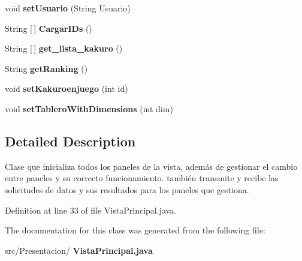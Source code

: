 \begin{DoxyCompactItemize}
\mbox{\label{class_presentacion_1_1_vista_principal_a40d595637eecfc198239a1cd1c05fbce}} 
void {\bfseries set\+Usuario} (String Usuario)
\item 
\mbox{\label{class_presentacion_1_1_vista_principal_a97c11c0e43c900c7cc2dfc4d4ed2ccb6}} 
String [$\,$] {\bfseries Cargar\+I\+Ds} ()
\item 
\mbox{\label{class_presentacion_1_1_vista_principal_a45ebd0e10cf0731cbd580006a2b9e365}} 
String [$\,$] {\bfseries get\+\_\+lista\+\_\+kakuro} ()
\item 
\mbox{\label{class_presentacion_1_1_vista_principal_a9c44d939388c8198de20e1255cd41313}} 
String {\bfseries get\+Ranking} ()
\item 
\mbox{\label{class_presentacion_1_1_vista_principal_ab5947b202b60acac8287ea0a3986af40}} 
void {\bfseries set\+Kakuroenjuego} (int id)
\item 
\mbox{\label{class_presentacion_1_1_vista_principal_af1096a92a8f67defc858f0559ec4adaa}} 
void {\bfseries set\+Tablero\+With\+Dimensions} (int dim)
\end{DoxyCompactItemize}


\subsection{Detailed Description}
Clase que inicializa todos los paneles de la vista, además de gestionar el cambio entre paneles y su correcto funcionamiento. también transmite y recibe las solicitudes de datos y sus resultados para los paneles que gestiona. 

Definition at line 33 of file Vista\+Principal.\+java.



The documentation for this class was generated from the following file\+:\begin{DoxyCompactItemize}
\item 
src/\+Presentacion/\textbf{ Vista\+Principal.\+java}\end{DoxyCompactItemize}
